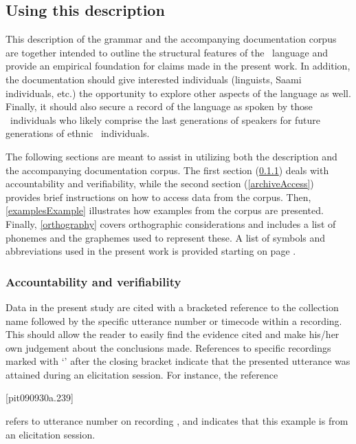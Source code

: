 

\subsection{Using this description}\label{usingThis}  
This description of the grammar and the accompanying documentation corpus are together intended to outline the structural features of the \PS\ language and provide an empirical foundation for claims made in the present work. In addition, the documentation should give interested individuals (linguists, Saami individuals, etc.) the opportunity to explore other aspects of the language as well. Finally, it should also secure a record of the language as spoken by those \PS\ individuals who likely comprise the last generations of speakers for future generations of ethnic \PS\ individuals. 

The following sections are meant to assist in utilizing both the description and the accompanying documentation corpus. 
The first section (\SEC\ref{accountabilityEtc}) deals with accountability and verifiability, while the second section (\SEC\ref{archiveAccess}) provides brief instructions on how to access data from the corpus. 
Then, \SEC\ref{examplesExample} illustrates how examples from the corpus are presented. %
Finally, \SEC\ref{orthography} covers orthographic considerations and includes a list of phonemes and the graphemes used to represent these. 
A list of symbols and abbreviations used in the present work is provided starting on page \pageref{symbolList}. 


\subsubsection{Accountability and verifiability}\label{accountabilityEtc}
Data in the present study are cited with a bracketed reference to the collection name followed by the specific utterance number or timecode within a recording. 
This should allow the reader to easily find the evidence cited and make his/her own judgement about the conclusions made. References to specific recordings marked with ‘’ after the closing bracket indicate that the presented utterance was attained during an elicitation session. 
For instance, the reference 
\begin{center}\small[pit090930a.239]\end{center}
refers to utterance number  on recording , and indicates that this example is from an elicitation session. %

